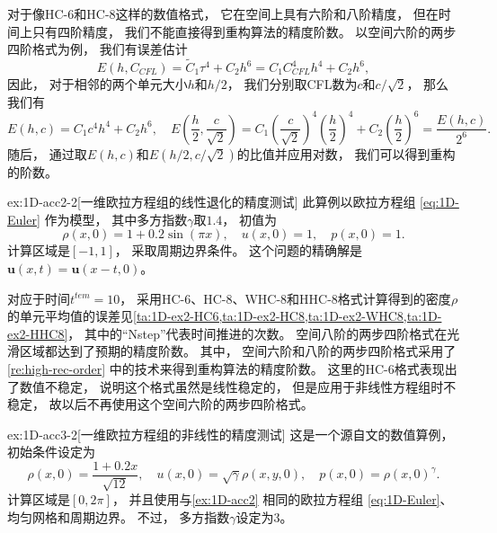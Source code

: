 \begin{remark}
  \label{re:high-rec-order}
  对于像HC-6和HC-8这样的数值格式，
  它在空间上具有六阶和八阶精度，
  但在时间上只有四阶精度，
  我们不能直接得到重构算法的精度阶数。
  以空间六阶的两步四阶格式为例，
  我们有误差估计
  \begin{equation}
    E(h,C_{CFL}) = \widetilde C_1 \tau^4 + C_2 h^6 = C_1 C_{CFL}^4 h^4 + C_2 h^6,
  \end{equation}
  因此，
  对于相邻的两个单元大小$h$和$h/2$，
  我们分别取CFL数为$c$和$c/\sqrt{2}$，
  那么我们有
  \begin{equation}
    E(h, c) = C_1 c^4 h^4 + C_2 h^6, \quad
    E\left(\frac{h}{2}, \frac{c}{\sqrt{2}}\right) = C_1 \left(\frac{c}{\sqrt{2}}\right)^4 \left(\frac{h}{2}\right)^4 + C_2 \left(\frac{h}{2}\right)^6 = \frac{E(h, c)}{2^6}.
  \end{equation}
  随后，
  通过取$E(h, c)$和$E(h/2, c/\sqrt{2})$的比值并应用对数，
  我们可以得到重构的阶数。
\end{remark}



\begin{exampleRe}{ex:1D-acc2}{-2}[一维欧拉方程组的线性退化的精度测试]
  \label{ex:1D-acc2-re}
  此算例以欧拉方程组 \cref{eq:1D-Euler} 作为模型，
  其中多方指数$\gamma$取$1.4$，
  初值为
  \begin{equation}
    \rho(x, 0) = 1 + 0.2\sin(\pi x), \quad u(x,0)=1, \quad p(x,0)=1.
  \end{equation}
  计算区域是$[-1,1]$，
  采取周期边界条件。
  这个问题的精确解是${\bm{u}}(x,t) = {\bm{u}}(x-t,0)$。
\end{exampleRe}

对应于时间$t^{tem}=10$，
采用HC-6、HC-8、WHC-8和HHC-8格式计算得到的密度$\rho$的单元平均值的误差见\cref{ta:1D-ex2-HC6,ta:1D-ex2-HC8,ta:1D-ex2-WHC8,ta:1D-ex2-HHC8}，
其中的“Nstep”代表时间推进的次数。
空间八阶的两步四阶格式在光滑区域都达到了预期的精度阶数。
其中，
空间六阶和八阶的两步四阶格式采用了\cref{re:high-rec-order} 中的技术来得到重构算法的精度阶数。
这里的HC-6格式表现出了数值不稳定，
说明这个格式虽然是线性稳定的，
但是应用于非线性方程组时不稳定，
故以后不再使用这个空间六阶的两步四阶格式。



\begin{exampleRe}{ex:1D-acc3}{-2}[一维欧拉方程组的非线性的精度测试]
  \label{ex:1D-acc3-re}
  这是一个源自文\cite{Gamma3-HWENO}的数值算例，
  初始条件设定为
  \begin{equation}
    \rho(x, 0)=\frac{1+0.2x}{\sqrt{12}}, \quad
    u(x, 0)=\sqrt{\gamma}\rho(x, y, 0), \quad
    p(x, 0)=\rho(x, 0)^\gamma.
  \end{equation}
  计算区域是$[0, 2\pi]$，
  并且使用与\cref{ex:1D-acc2} 相同的欧拉方程组 \cref{eq:1D-Euler}、均匀网格和周期边界。
  不过，
  多方指数$\gamma$设定为3。
\end{exampleRe}

